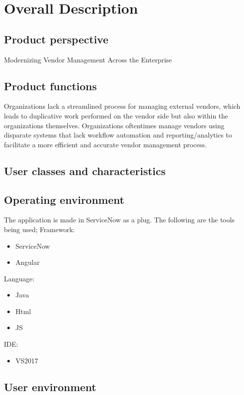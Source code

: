\documentclass[10pt]{article}
\begin{document}
\section{Overall Description}

\subsection{Product perspective}

Modernizing Vendor Management Across the Enterprise

\subsection{Product functions}

Organizations lack a streamlined process for managing external vendors, which leads to duplicative work performed on the vendor side but also within the organizations themselves. Organizations oftentimes manage vendors using disparate systems that lack workflow automation and reporting/analytics to facilitate a more efficient and accurate vendor management process.

\subsection{User classes and characteristics}

\lipsum[10]

\subsection{Operating environment}

The application is made in ServiceNow as a plug. The following are the tools being used;
Framework:
\begin{itemize}
	\item ServiceNow
	\item Angular
\end{itemize}
Language:
\begin{itemize}
	\item Java
	\item Html
	\item JS
\end{itemize}
IDE:
\begin{itemize}
	\item VS2017
\end{itemize}

\subsection{User environment}
\end{document}

